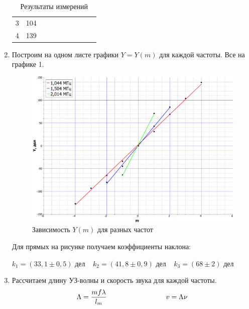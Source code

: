 \documentclass[a4paper,12pt]{article} %
\begin{document}
\begin{enumerate}
\begin{table}[h!]
\begin{tabular}{|cc|cccclccc}
					\multicolumn{1}{|c|}{3}    & 104      &  &                       &                          &                               &  &                       &                          &                               \\ \cline{1-2}
					\multicolumn{1}{|c|}{4}    & 139      &  &                       &                          &                               &  &                       &                          &                               \\ \cline{1-2}
				\end{tabular}
			\caption{Результаты измерений}
		\end{table}
		
		\item Построим на одном листе графики $Y = Y(m)$ для каждой частоты. Все на графике 1.
		\newpage
		\begin{figure}[h!]
			\centering
			\includegraphics[width=0.9\linewidth]{Pictures/Graphs}
			\caption{Зависимость $Y(m)$ для разных частот}
		\end{figure}
	
	Для прямых на рисунке получаем коэффициенты наклона:
	
	$\boxed{k_1 = (33,1 \pm 0,5) \text{ дел}} \;\;\;\; \boxed{k_2 = (41,8 \pm 0,9) \text{ дел}} \;\;\;\; \boxed{k_3 = (68 \pm 2) \text{ дел}}$
	
	\item Рассчитаем длину УЗ-волны и скорость звука для каждой частоты.
	\begin{equation*}
		\Lambda = \frac{mf\lambda}{l_m} \hspace{30mm} v = \Lambda\nu
	\end{equation*}


\end{enumerate}
\end{document}

